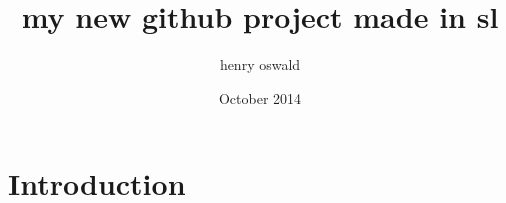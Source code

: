\documentclass{article}
\title{my new github project made in sl}
\author{henry oswald}
\date{October 2014}
\begin{document}
\maketitle

\section{Introduction}
\end{document}
